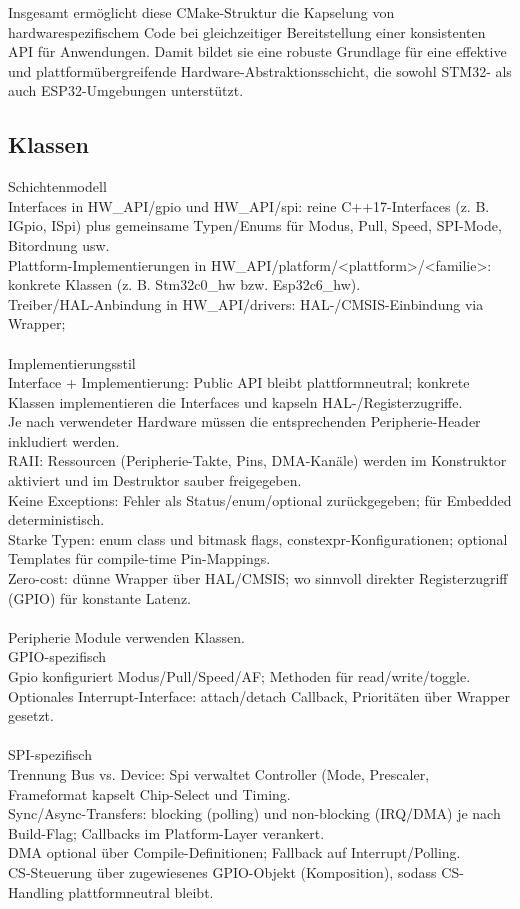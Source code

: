 Insgesamt ermöglicht diese CMake-Struktur die Kapselung von hardwarespezifischem Code bei gleichzeitiger Bereitstellung einer konsistenten API für Anwendungen. 
Damit bildet sie eine robuste Grundlage für eine effektive und plattformübergreifende Hardware-Abstraktionsschicht, die sowohl STM32- als auch ESP32-Umgebungen unterstützt.

\subsection{Klassen}
Schichtenmodell
\\Interfaces in HW\_API/gpio und HW\_API/spi: reine C++17-Interfaces (z. B. IGpio, ISpi) plus gemeinsame Typen/Enums für Modus, Pull, Speed, SPI-Mode, Bitordnung usw.
\\Plattform-Implementierungen in HW\_API/platform/<plattform>/<familie>: konkrete Klassen (z. B. Stm32c0\_hw bzw. Esp32c6\_hw).
\\Treiber/HAL-Anbindung in HW\_API/drivers: HAL-/CMSIS-Einbindung via Wrapper;
\\
\\Implementierungsstil
\\Interface + Implementierung: Public API bleibt plattformneutral; konkrete Klassen implementieren die Interfaces und kapseln HAL-/Registerzugriffe.
\\Je nach verwendeter Hardware müssen die entsprechenden Peripherie-Header inkludiert werden.
\\RAII: Ressourcen (Peripherie-Takte, Pins, DMA-Kanäle) werden im Konstruktor aktiviert und im Destruktor sauber freigegeben.
\\Keine Exceptions: Fehler als Status/enum/optional zurückgegeben; für Embedded deterministisch.
\\Starke Typen: enum class und bitmask flags, constexpr-Konfigurationen; optional Templates für compile-time Pin-Mappings.
\\Zero-cost: dünne Wrapper über HAL/CMSIS; wo sinnvoll direkter Registerzugriff (GPIO) für konstante Latenz.
\\
\\Peripherie Module verwenden Klassen.
\\GPIO-spezifisch
\\Gpio konfiguriert Modus/Pull/Speed/AF; Methoden für read/write/toggle.
Optionales Interrupt-Interface: attach/detach Callback, Prioritäten über Wrapper gesetzt.
\\
\\SPI-spezifisch
\\Trennung Bus vs. Device: Spi verwaltet Controller (Mode, Prescaler, Frameformat kapselt Chip-Select und Timing.
\\Sync/Async-Transfers: blocking (polling) und non-blocking (IRQ/DMA) je nach Build-Flag; Callbacks im Platform-Layer verankert.
\\DMA optional über Compile-Definitionen; Fallback auf Interrupt/Polling.
\\CS-Steuerung über zugewiesenes GPIO-Objekt (Komposition), sodass CS-Handling plattformneutral bleibt.

